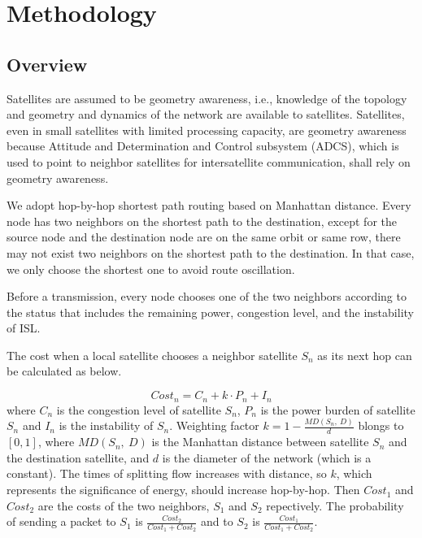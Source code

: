 \section{Methodology}


\subsection{Overview}
\label{sec:LEOMDL}

Satellites are assumed to be geometry awareness, i.e., knowledge of the topology and geometry and dynamics of the network are available to satellites. Satellites, even in small satellites with limited processing capacity, are geometry awareness because Attitude and Determination and Control subsystem (ADCS), which is used to point to neighbor satellites for intersatellite communication, shall rely on geometry awareness.

We adopt hop-by-hop shortest path routing based on Manhattan distance. Every node has two neighbors on the shortest path to the destination, except for the source node and the destination node are on the same orbit or same row, there may not exist two neighbors on the shortest path to the destination. In that case, we only choose the shortest one to avoid route oscillation.

Before a transmission, every node chooses one of the two neighbors according to the status that includes the remaining power, congestion level, and the instability of ISL.

The cost when a local satellite chooses a neighbor satellite $S_n$ as its next hop can be calculated as below.

\begin{equation}
	Cost_{n}=C_{n}+k \cdot P_{n}+I_{n}
\end{equation}
where $C_n$ is the congestion level of satellite $S_n$, $P_n$ is the power burden of satellite $S_n$ and $I_n$ is the instability of $S_n$.
Weighting factor $k=1-\frac{MD(S_n,\ D)}{d}$ blongs to $[0,1]$,  where $MD(S_n,\ D)$ is the Manhattan distance between satellite $S_n$ and the destination satellite, and $d$ is the diameter of the network (which is a constant). The times of splitting flow increases with distance, so  $k$, which represents the significance of energy, should increase hop-by-hop. Then $Cost_1$ and $Cost_2$ are the costs of the two neighbors, $S_1$ and $S_2$ repectively. The probability of sending a packet to $S_1$ is $\frac{Cost_2}{Cost_1+Cost_2}$ and to $S_2$ is $\frac{Cost_1}{Cost_1+Cost_2}$.


